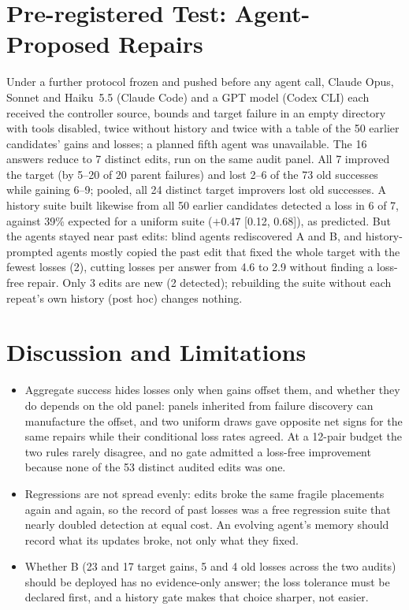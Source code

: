 \documentclass[letterpaper]{article} %
\begin{document}
\section{Pre-registered Test: Agent-Proposed Repairs}
Under a further protocol frozen and pushed before any agent call, Claude Opus, Sonnet and Haiku~5.5 (Claude Code) and a GPT model (Codex CLI) each received the controller source, bounds and target failure in an empty directory with tools disabled, twice without history and twice with a table of the 50 earlier candidates' gains and losses; a planned fifth agent was unavailable. The 16 answers reduce to 7 distinct edits, run on the same audit panel. All 7 improved the target (by 5--20 of 20 parent failures) and lost 2--6 of the 73 old successes while gaining 6--9; pooled, all 24 distinct target improvers lost old successes. A history suite built likewise from all 50 earlier candidates detected a loss in 6 of 7, against 39\% expected for a uniform suite ($+0.47$ [0.12, 0.68]), as predicted. But the agents stayed near past edits: blind agents rediscovered A and B, and history-prompted agents mostly copied the past edit that fixed the whole target with the fewest losses (2), cutting losses per answer from 4.6 to 2.9 without finding a loss-free repair. Only 3 edits are new (2 detected); rebuilding the suite without each repeat's own history (post hoc) changes nothing.

\section{Discussion and Limitations}
\begin{itemize}
\item Aggregate success hides losses only when gains offset them, and whether they do depends on the old panel: panels inherited from failure discovery can manufacture the offset, and two uniform draws gave opposite net signs for the same repairs while their conditional loss rates agreed. At a 12-pair budget the two rules rarely disagree, and no gate admitted a loss-free improvement because none of the 53 distinct audited edits was one.
\item Regressions are not spread evenly: edits broke the same fragile placements again and again, so the record of past losses was a free regression suite that nearly doubled detection at equal cost. An evolving agent's memory should record what its updates broke, not only what they fixed.
\item Whether B (23 and 17 target gains, 5 and 4 old losses across the two audits) should be deployed has no evidence-only answer; the loss tolerance must be declared first, and a history gate makes that choice sharper, not easier.
\end{itemize}
\end{document}
